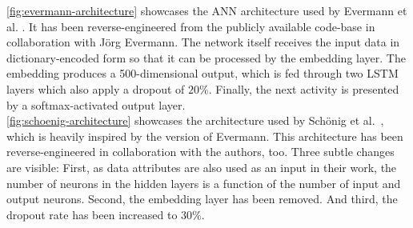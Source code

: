 \autoref{fig:evermann-architecture} showcases the ANN architecture used by Evermann et al. \cite{evermann2016}. It has been reverse-engineered from the publicly available code-base \cite{web:evermann} in collaboration with Jörg Evermann. The network itself receives the input data in dictionary-encoded form so that it can be processed by the embedding layer. The embedding produces a 500-dimensional output, which is fed through two LSTM layers which also apply a dropout of $20\%$. Finally, the next activity is presented by a softmax-activated output layer.\\

\autoref{fig:schoenig-architecture} showcases the architecture used by Schönig et al.~\cite{schoenig2018}, which is heavily inspired by the version of Evermann. This architecture has been reverse-engineered in collaboration with the authors, too. Three subtle changes are visible: First, as data attributes are also used as an input in their work, the number of neurons in the hidden layers is a function of the number of input and output neurons. Second, the embedding layer has been removed. And third, the dropout rate has been increased to $30\%$.

